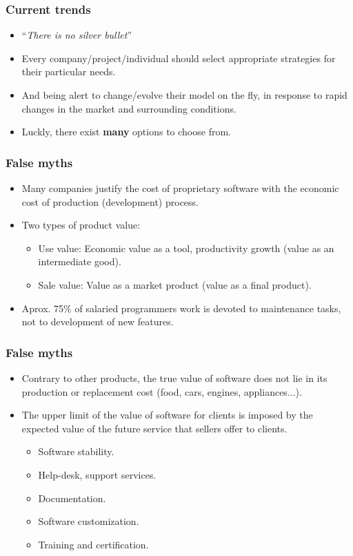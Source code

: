 \begin{frame}
 \frametitle{Current trends}
 \begin{itemize}
 \item ``\textit{There is no silver bullet}''
 \item Every company/project/individual should select appropriate strategies for their particular needs.
 \item And being alert to change/evolve their model on the fly, in response to rapid changes in the market
and surrounding conditions.
 \item Luckly, there exist \textbf{many} options to choose from.
 \end{itemize}
\end{frame}

\begin{frame}
 \frametitle{False myths}
\begin{itemize}
 \item Many companies justify the cost of proprietary software with the economic cost of production (development) process.
\item Two types of product value:
    \begin{itemize}
     \item \alert{Use} value: Economic value as a tool, productivity growth (value as an intermediate good).
     \item \alert{Sale} value: Value as a market product (value as a final product).
    \end{itemize}
\item Aprox. 75\% of salaried programmers work is devoted to
\alert{maintenance} tasks, not to \alert{development} of new features.
\end{itemize}

\end{frame}

\begin{frame}
 \frametitle{False myths}
\begin{itemize}
 \item Contrary to other products, the true \alert{value} of software does not lie in its production
or replacement cost (food, cars, engines, appliances...).
 \item The upper limit of the value of software for clients is imposed by 
the \alert{expected value} of the future \alert{service} that sellers offer to clients.
      \begin{itemize}
       \item Software stability.
       \item Help-desk, support services.
       \item Documentation.
       \item Software customization.
       \item Training and certification.
      \end{itemize}
  \pause
\end{itemize}

\end{frame}

